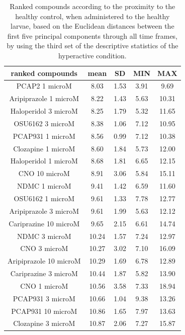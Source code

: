 \documentclass[a4paper,12pt]{article}
\begin{document}
\begin{table}[h!]\tiny
\centering
\caption{Ranked compounds according to the proximity to the healthy control, when administered to the healthy larvae, based on the Euclidean distances between the first five principal components through all time frames, by using the third set of the descriptive statistics of the hyperactive condition.}
\begin{tabular}{|c|c|c|c|c|}
\hline
ranked compounds             & mean & SD   & MIN  & MAX   \\ \hline
PCAP2 1 microM         & 8.03  & 1.53 & 3.91  & 9.69  \\ \hline
Aripiprazole 1 microM  & 8.22  & 1.43 & 5.63  & 10.31 \\ \hline
Haloperidol 3 microM   & 8.25  & 1.79 & 5.32  & 11.65 \\ \hline
OSU6162 3 microM       & 8.38  & 1.06 & 7.12  & 10.95 \\ \hline
PCAP931 1 microM       & 8.56  & 0.99 & 7.12  & 10.38 \\ \hline
Clozapine 1 microM     & 8.60   & 1.84 & 5.73  & 12.00    \\ \hline
Haloperidol 1 microM   & 8.68  & 1.81 & 6.65  & 12.15 \\ \hline
CNO 10 microM          & 8.91  & 3.06 & 5.84  & 15.11 \\ \hline
NDMC 1 microM          & 9.41  & 1.42 & 6.59  & 11.60  \\ \hline
OSU6162 1 microM       & 9.61  & 1.33 & 7.78  & 12.77 \\ \hline
Aripiprazole 3 microM  & 9.61  & 1.99 & 5.63  & 12.12 \\ \hline
Cariprazine 10 microM  & 9.65  & 2.15 & 6.61  & 14.74 \\ \hline
NDMC 3 microM          & 10.24 & 1.57 & 7.24  & 12.97 \\ \hline
CNO 3 microM           & 10.27 & 3.02 & 7.10   & 16.09 \\ \hline
Aripiprazole 10 microM & 10.29 & 1.69 & 6.78  & 12.89 \\ \hline 
Cariprazine 3 microM   & 10.44 & 1.87 & 5.82  & 13.90  \\ \hline
CNO 1 microM           & 10.56 & 3.58 & 7.33  & 18.94 \\ \hline
PCAP931 3 microM       & 10.66 & 1.04 & 9.38  & 13.26 \\ \hline
PCAP931 10 microM      & 10.86 & 1.65 & 7.97  & 13.63 \\ \hline
Clozapine 3 microM     & 10.87 & 2.06 & 7.27  & 15.87 \\ \hline

\end{tabular}
\end{table}
\end{document}
